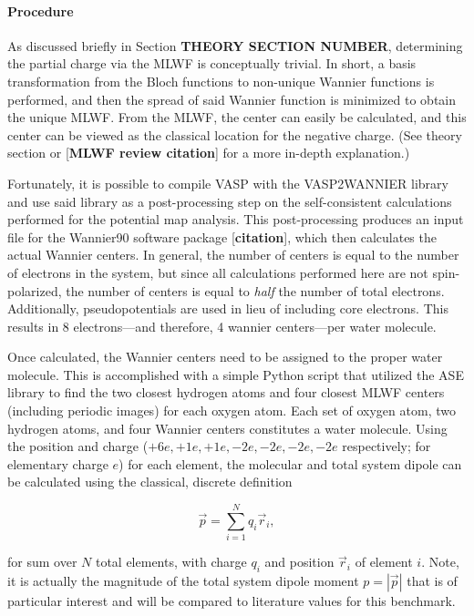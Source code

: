     \paragraph{Procedure} As discussed briefly in Section \textbf{THEORY SECTION NUMBER}, determining the partial charge via the MLWF is conceptually trivial. In short, a basis transformation from the Bloch functions to non-unique Wannier functions is performed, and then the spread of said Wannier function is minimized to obtain the unique MLWF. From the MLWF, the center can easily be calculated, and this center can be viewed as the classical location for the negative charge. (See theory section or [\textbf{MLWF review citation}] for a more in-depth explanation.) 
    
    Fortunately, it is possible to compile VASP with the VASP2WANNIER library and use said library as a post-processing step on the self-consistent calculations performed for the potential map analysis. This post-processing produces an input file for the Wannier90 software package [\textbf{citation}], which then calculates the actual Wannier centers. In general, the number of centers is equal to the number of electrons in the system, but since all calculations performed here are not spin-polarized, the number of centers is equal to \textit{half} the number of total electrons. Additionally, pseudopotentials are used in lieu of including core electrons. This results in 8 electrons---and therefore, 4 wannier centers---per water molecule.
    
    Once calculated, the Wannier centers need to be assigned to the proper water molecule. This is accomplished with a simple Python script that utilized the ASE library to find the two closest hydrogen atoms and four closest MLWF centers (including periodic images) for each oxygen atom. Each set of oxygen atom, two hydrogen atoms, and four Wannier centers constitutes a water molecule. Using the position and charge ($+6e, +1e, +1e, -2e, -2e, -2e, -2e$ respectively; for elementary charge $e$) for each element, the molecular and total system dipole can be calculated using the classical, discrete definition
    
    \begin{equation}
    \label{eq:dipole_def}
        \Vec{p} = \sum\limits_{i=1}^{N} q_i \Vec{r}_i,
    \end{equation}
    
    \noindent for sum over $N$ total elements, with charge $q_i$ and position $\Vec{r}_i$ of element $i$. Note, it is actually the magnitude of the total system dipole moment $ p = |\Vec{p}|$ that is of particular interest and will be compared to literature values for this benchmark.
    
